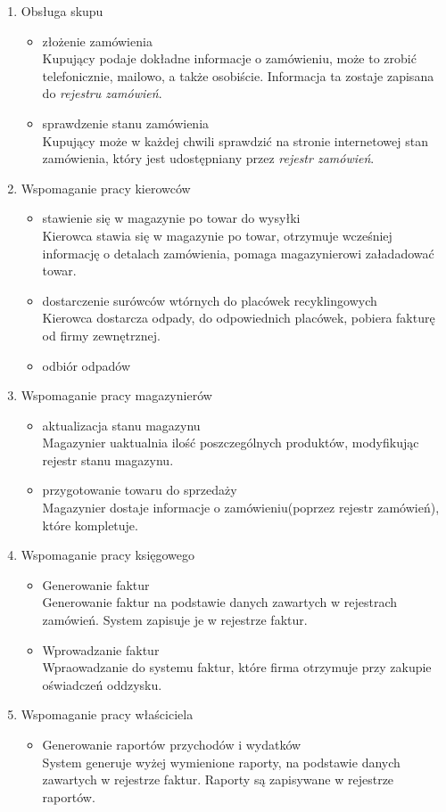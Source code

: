 \begin{enumerate}
	\item Obsługa skupu
		\begin{itemize}
		\item złożenie zamówienia \\
		Kupujący podaje dokładne informacje o zamówieniu, może to zrobić telefonicznie, mailowo, a także osobiście. Informacja ta zostaje zapisana do \emph{rejestru zamówień}.
		\item sprawdzenie stanu zamówienia \\ 
		Kupujący może w każdej chwili sprawdzić na stronie internetowej stan zamówienia, który jest udostępniany przez \emph{rejestr zamówień}.
		\end{itemize}
	\item Wspomaganie pracy kierowców 
		\begin{itemize}
		\item stawienie się w magazynie po towar do wysyłki \\ 
		Kierowca stawia się w magazynie po towar, otrzymuje wcześniej informację o detalach zamówienia, pomaga magazynierowi załadadować towar.
		\item dostarczenie surówców wtórnych do placówek recyklingowych \\ 
		Kierowca dostarcza odpady, do odpowiednich placówek, pobiera fakturę od firmy zewnętrznej.
		\item odbiór odpadów
		\end{itemize}
	\item Wspomaganie pracy magazynierów
		\begin{itemize}
		\item aktualizacja stanu magazynu \\
	 	Magazynier uaktualnia ilość poszczególnych produktów, modyfikując rejestr stanu magazynu.
	 	\item przygotowanie towaru do sprzedaży \\
	 	Magazynier dostaje informacje o zamówieniu(poprzez rejestr zamówień), które kompletuje.
		\end{itemize}
	\item Wspomaganie pracy księgowego
		\begin{itemize}
		\item Generowanie faktur \\ 
		Generowanie faktur na podstawie danych zawartych w rejestrach zamówień. System zapisuje je w rejestrze faktur.
		\item Wprowadzanie faktur \\
		Wpraowadzanie do systemu faktur, które firma otrzymuje przy zakupie oświadczeń oddzysku.
		\end{itemize}
	\item Wspomaganie pracy właściciela
		\begin{itemize}
		\item Generowanie raportów przychodów i wydatków\\
		System generuje wyżej wymienione raporty, na podstawie danych zawartych w rejestrze faktur. Raporty są zapisywane w rejestrze raportów.
		\end{itemize}

\end{enumerate}